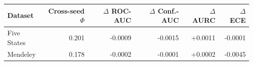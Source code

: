 \begin{tabular}{lrrrrr}
\toprule
Dataset & Cross-seed $\Phi$ & $\Delta$ ROC-AUC & $\Delta$ Conf.-AUC & $\Delta$ AURC & $\Delta$ ECE \\
\midrule
Five States & 0.201 & -0.0009 & -0.0015 & +0.0011 & -0.0001 \\
Mendeley & 0.178 & -0.0002 & -0.0001 & +0.0002 & -0.0045 \\
\bottomrule
\end{tabular}
